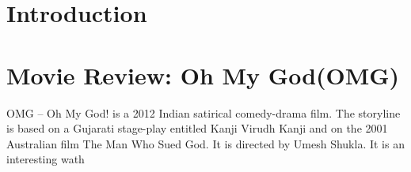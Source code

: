 \documentclass{article}
\begin{document}
\section{Introduction}
\section{Movie Review: Oh My God(OMG)}
OMG – Oh My God! is a 2012 Indian satirical comedy-drama film. The storyline is based on a Gujarati stage-play entitled Kanji Virudh Kanji and on the 2001 Australian film The Man Who Sued God. It is directed by Umesh Shukla. It is an interesting wath
\end{document}

